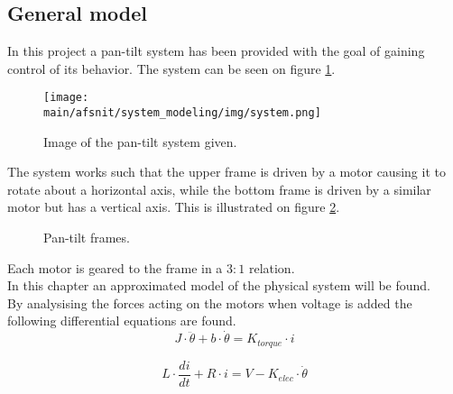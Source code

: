 \documentclass[../../main]{subfiles}
\begin{document}
\subsection{General model}
\label{ch:General_model}

In this project a pan-tilt system has been provided with the goal of gaining control of its behavior. The system can be seen on figure \ref{fig:ImageOfPanTiltSystem}.

\begin{figure}[h]
  \centering
  \texttt{[image: \\main/afsnit/system\_modeling/img/system.png]}
  \caption{Image of the pan-tilt system given.}
  \label{fig:ImageOfPanTiltSystem}
\end{figure}

The system works such that the upper frame is driven by a motor causing it to rotate about a horizontal axis, while the bottom frame is driven by a similar motor but has a vertical axis. This is illustrated on figure \ref{fig:pan-tilt_frames}.

  \begin{figure}[h]
    \centering
  \def\svgwidth{0.4\columnwidth}
  \qquad
  \def\svgwidth{0.2\columnwidth}
  \caption{Pan-tilt frames.}
  \label{fig:pan-tilt_frames}
  \end{figure}

Each motor is geared to the frame in a $3:1$ relation.\\

In this chapter an approximated model of the physical system will be found.\\

By analysising the forces acting on the motors when voltage is added the following differential equations are found.\\

\begin{equation}
  \label{equ:model_mech_equ}
  J\cdot \ddot \theta + b\cdot \dot \theta = K_{torque}\cdot i
\end{equation}

\begin{equation}
  \label{equ:model_ele_equ}
  L\cdot \frac{di}{dt} + R\cdot i = V - K_{elec}\cdot \dot \theta
\end{equation}
\end{document}
